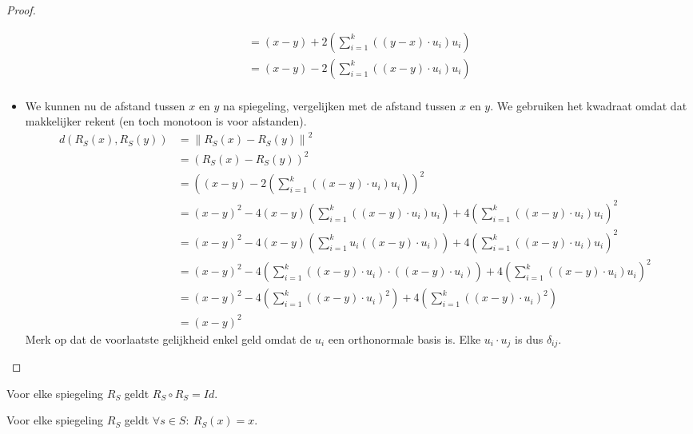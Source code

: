 \documentclass[main.tex]{subfiles}
\begin{document}
\begin{st}
\begin{proof}
\begin{itemize}
\[\begin{array}{rll}
                           &= (x-y) + 2\left(\sum_{i=1}^{k}((y-x)\cdot u_{i} )u_{i}\right) &\\
                           &= (x-y) - 2\left(\sum_{i=1}^{k}((x-y)\cdot u_{i} )u_{i}\right) &\\
      \end{array}
      \]
    \item We kunnen nu de afstand tussen $x$ en $y$ na spiegeling, vergelijken met de afstand tussen $x$ en $y$.
      We gebruiken het kwadraat omdat dat makkelijker rekent (en toch monotoon is voor afstanden).
      \[
      \begin{array}{rll}
        d(R_{S}(x),R_{S}(y)) &= \left\| R_{S}(x) - R_{S}(y)\right\|^{2} & \\
                            &= (R_{S}(x) - R_{S}(y))^{2} &\\
                            &= \left((x-y) - 2\left(\sum_{i=1}^{k}((x-y)\cdot u_{i} )u_{i}\right)\right)^{2} &\\
                            &= (x-y)^{2} -4(x-y)\left(\sum_{i=1}^{k}((x-y)\cdot u_{i} )u_{i}\right) + 4\left(\sum_{i=1}^{k}((x-y)\cdot u_{i} )u_{i}\right)^{2} &\\
                            &= (x-y)^{2} -4(x-y)\left(\sum_{i=1}^{k}u_{i}((x-y)\cdot u_{i} )\right) + 4\left(\sum_{i=1}^{k}((x-y)\cdot u_{i} )u_{i}\right)^{2} &\\
                            &= (x-y)^{2} -4\left(\sum_{i=1}^{k}((x-y) \cdot u_{i})\cdot((x-y)\cdot u_{i} )\right) + 4\left(\sum_{i=1}^{k}((x-y)\cdot u_{i} )u_{i}\right)^{2} &\\
                            &= (x-y)^{2} -4\left(\sum_{i=1}^{k}((x-y)\cdot u_{i} )^{2}\right) + 4\left(\sum_{i=1}^{k}((x-y)\cdot u_{i} )^{2}\right) &\\
                            &= (x-y)^{2}
      \end{array}
      \]
      Merk op dat de voorlaatste gelijkheid enkel geld omdat de $u_{i}$ een orthonormale basis is.
      Elke $u_{i}\cdot u_{j}$ is dus $\delta_{ij}$.
      
    \end{itemize}
  \end{proof}
\end{st}

\begin{st}
  Voor elke spiegeling $R_{S}$ geldt $R_{S} \circ R_{S} = Id$.
\end{st}

\begin{st}
  Voor elke spiegeling $R_{S}$ geldt $\forall s \in S:\ R_{S}(x) = x$.
\end{st}
\end{document}
